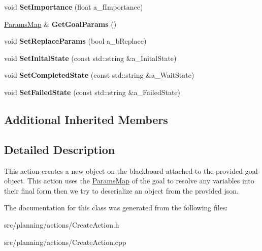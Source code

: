 \begin{DoxyCompactItemize}
\mbox{\label{class_create_action_a490159d7be18034ee11b2faf1bda96d0}} 
void {\bfseries Set\+Importance} (float a\+\_\+f\+Importance)
\item 
\mbox{\label{class_create_action_ac45e984d2846e7584d9bc2f1a11d8b03}} 
\hyperlink{class_params_map}{Params\+Map} \& {\bfseries Get\+Goal\+Params} ()
\item 
\mbox{\label{class_create_action_a7d87f0df66148df95bffd8449f64af13}} 
void {\bfseries Set\+Replace\+Params} (bool a\+\_\+b\+Replace)
\item 
\mbox{\label{class_create_action_a5a25fab15f93477461590466f2fd2273}} 
void {\bfseries Set\+Inital\+State} (const std\+::string \&a\+\_\+\+Inital\+State)
\item 
\mbox{\label{class_create_action_a8121af05414f2f4cf26e5f4d86b68c3c}} 
void {\bfseries Set\+Completed\+State} (const std\+::string \&a\+\_\+\+Wait\+State)
\item 
\mbox{\label{class_create_action_a5019cd728a3f3a59b4ff9f4719c309a7}} 
void {\bfseries Set\+Failed\+State} (const std\+::string \&a\+\_\+\+Failed\+State)
\end{DoxyCompactItemize}
\subsection*{Additional Inherited Members}


\subsection{Detailed Description}
This action creates a new object on the blackboard attached to the provided goal object. This action uses the \hyperlink{class_params_map}{Params\+Map} of the goal to resolve any variables into their final form then we try to deserialize an object from the provided json. 

The documentation for this class was generated from the following files\+:\begin{DoxyCompactItemize}
\item 
src/planning/actions/Create\+Action.\+h\item 
src/planning/actions/Create\+Action.\+cpp\end{DoxyCompactItemize}
